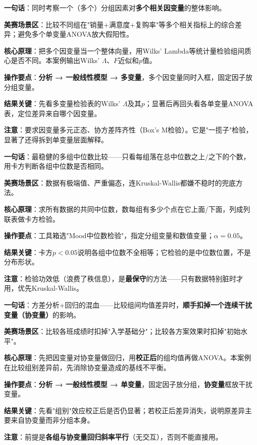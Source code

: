 
\begin{algobrief}
\textbf{一句话}：同时考察一个（多个）分组因素对\textbf{多个相关因变量}的整体影响。

\textbf{美赛场景区}：比较不同组在"销量+满意度+复购率"等多个相关指标上的综合差异；避免多个单变量ANOVA放大假阳性。

\textbf{核心原理}：把多个因变量当一个整体向量，用Wilks' Lambda等统计量检验组间质心是否不同。本案例输出Wilks' $\Lambda$、$F$近似和$p$值。

\textbf{操作要点}：\textbf{分析 → 一般线性模型 → 多变量}，多个因变量同时入框，固定因子放分组变量。

\textbf{结果关键}：先看多变量检验表的Wilks' $\Lambda$及其$p$；显著后再回头看各单变量ANOVA表，定位差异来自哪个因变量。

\textbf{注意}：要求因变量多元正态、协方差阵齐性（Box's M检验）。它是"一揽子"检验，显著了还得拆到单变量层面解释。
\end{algobrief}


\begin{algobrief}
\textbf{一句话}：最稳健的多组中位数比较——只看每组落在总中位数之上/之下的个数，用卡方判断各组中位数是否相同。

\textbf{美赛场景区}：数据有极端值、严重偏态，连Kruskal-Wallis都嫌不稳时的兜底方法。

\textbf{核心原理}：求所有数据的共同中位数，数每组有多少个点在它上面/下面，列成列联表做卡方检验。

\textbf{操作要点}：工具箱选"Mood中位数检验"，指定分组变量和数值变量；$\alpha=0.05$。

\textbf{结果关键}：卡方$p<0.05$说明各组中位数不全相等；它检验的是中位数位置，不是分布形状。

\textbf{注意}：检验功效低（浪费了秩信息），是\textbf{最保守}的方法——只有数据特别脏时才用，优先Kruskal-Wallis。
\end{algobrief}


\begin{algobrief}
\textbf{一句话}：方差分析+回归的混血——比较组间均值差异时，\textbf{顺手扣掉一个连续干扰变量（协变量）}的影响。

\textbf{美赛场景区}：比较各班成绩时扣掉"入学基础分"；比较各方案效果时扣掉"初始水平"。

\textbf{核心原理}：先把因变量对协变量做回归，用\textbf{校正后}的组均值再做ANOVA。本案例在比较组别差异前，先消除协变量造成的基线不平衡。

\textbf{操作要点}：\textbf{分析 → 一般线性模型 → 单变量}，固定因子放分组，\textbf{协变量}框放干扰变量。

\textbf{结果关键}：先看"组别"效应校正后是否仍显著；若校正后差异消失，说明原差异主要来自协变量而非分组本身。

\textbf{注意}：前提是\textbf{各组与协变量回归斜率平行}（无交互），否则不能直接用。
\end{algobrief}

